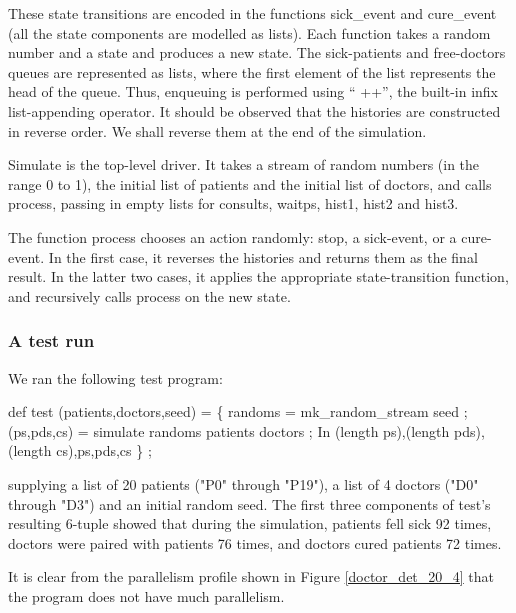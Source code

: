 These state transitions are encoded in the functions {\cf sick\_event}
and {\cf cure\_event} (all the state components are modelled as
lists).  Each function takes a random number and a state and produces
a new state.  The sick-patients and free-doctors queues are
represented as lists, where the first element of the list represents
the head of the queue.  Thus, enqueuing is performed using ``{\cf
++}'', the built-in infix list-appending operator.  It should be
observed that the histories are constructed in reverse order.  We
shall reverse them at the end of the simulation.

{\cf Simulate} is the top-level driver.  It takes a stream of random
numbers (in the range 0 to 1), the initial list of patients and the
initial list of doctors, and calls {\cf process}, passing in empty
lists for {\cf consults}, {\cf waitps}, {\cf hist1}, {\cf hist2} and
{\cf hist3}.

The function {\cf process} chooses an action randomly: stop, a
sick-event, or a cure-event.  In the first case, it reverses the
histories and returns them as the final result.  In the latter two
cases, it applies the appropriate state-transition function, and
recursively calls {\cf process} on the new state.

\subsubsection{A test run}

We ran the following test program:

\begin{minipage}{\textwidth}
\begin{idenv}
def test (patients,doctors,seed) =
    \{ randoms = mk\_random\_stream seed ;
      (ps,pds,cs) = simulate randoms patients doctors ;
    In
      (length ps),(length pds),(length cs),ps,pds,cs \} ;
\end{idenv}
\end{minipage}

supplying a list of 20 patients ({\cf "P0"} through {\cf "P19"}), a
list of 4 doctors ({\cf "D0"} through {\cf "D3"}) and an initial
random seed.  The first three components of {\cf test}'s resulting
6-tuple showed that during the simulation, patients fell sick 92
times, doctors were paired with patients 76 times, and doctors cured
patients 72 times.

It is clear from the parallelism profile shown in Figure
\ref{doctor_det_20_4} that the program does not have much parallelism.

